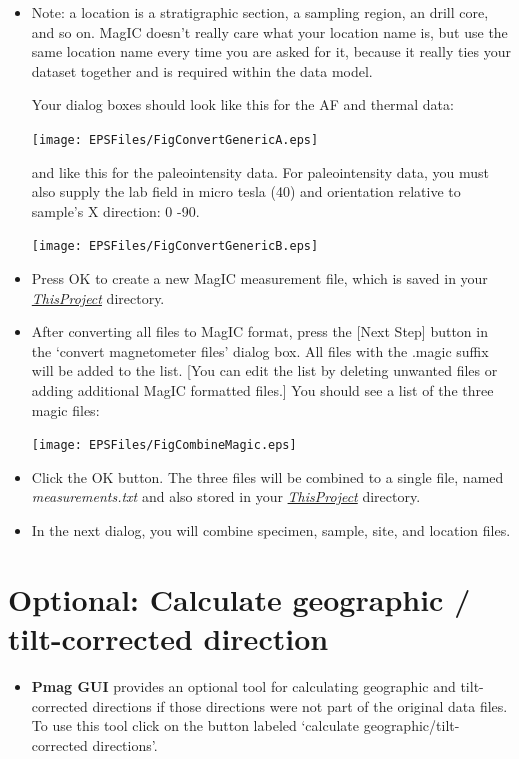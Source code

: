 \documentclass[11pt]{book}
\begin{document}
{{\begin{itemize}
\item Note:  a location is a stratigraphic section,  a sampling region,  an drill core, and so on.  MagIC doesn't really care what your location name is, but use the same location name every time you are asked for it, because it really ties your dataset together and is required within the data model.

Your dialog boxes should look like this for the AF and thermal data:

\texttt{[image: EPSFiles/FigConvertGenericA.eps]}

and like this for the  paleointensity data.  For paleointensity data, you must also supply the lab field in micro tesla (40) and orientation relative to sample's X direction:  0 -90.

\texttt{[image: EPSFiles/FigConvertGenericB.eps]}

\item Press OK to create a new MagIC measurement file, which is saved in your \href{#Project_Directory}{\it ThisProject} directory.



\item After converting all files to MagIC format, press the [Next Step] button in the `convert magnetometer files' dialog box. All files with the .magic suffix will be added to the list.  [You can edit the list by deleting unwanted files or adding additional MagIC formatted files.]   You should see a list of the three magic files:

\texttt{[image: EPSFiles/FigCombineMagic.eps]}

\item Click the OK button. The three files will be combined to a single file,  named {\it measurements.txt} and also stored  in your \href{#Project_Directory}{\it ThisProject} directory.

\item In the next dialog, you will combine specimen, sample, site, and location files.
\end{itemize}


\section{Optional: Calculate geographic / tilt-corrected direction}
\begin{itemize}
\item {\bf Pmag GUI} provides an optional tool for calculating geographic and tilt-corrected directions if those directions were not part of the original data files. To use this tool click on the button labeled `calculate geographic/tilt-corrected directions'.


\end{itemize}}}
\end{document}
